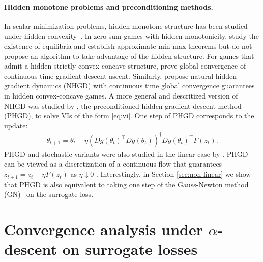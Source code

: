 \documentclass{article} %
\theoremstyle{definition}
\begin{document}
\paragraph{Hidden monotone problems and preconditioning methods.}
In scalar minimization problems, hidden monotone structure has been studied under hidden convexity~\citep{JMLR:francis,xia2020survey, chancelier2021conditional, fatkhullin2023stochastic}.
In zero-sum games with hidden monotonicity, \citet{gidel2021limited} study the existence of equilibria and establish approximate min-max theorems but do not propose an algorithm to take advantage of the hidden structure.
For games that admit a hidden strictly convex-concave structure, \citet{vlatakis2021solving} prove global convergence of continuous time gradient descent-ascent.
Similarly, \citet{mladenovic2022generalized} propose natural hidden gradient dynamics (NHGD) with continuous time global convergence guarantees in hidden convex-concave games.
A more general and descritized version of NHGD was studied by \citet{sakos2024exploiting}, the preconditioned hidden gradient descent method (PHGD), to solve VIs of the form \eqref{eq:vi}. One step of PHGD corresponds to the update:
\begin{align}\label{eq:phgd}
    \theta_{t+1} = \theta_t - \eta(Dg(\theta_t)^\top Dg(\theta_t))^{\dag}Dg(\theta_t)^\top F(z_t).
\end{align}
PHGD and stochastic variants were also studied in the linear case by \citet{bertsekas2009projected}.
PHGD can be viewed as a discretization of a continuous flow that guarantees $z_{t+1} = z_t-\eta F(z_t)$ as $\eta \downarrow 0$ \citep{sakos2024exploiting}. 
Interestingly, in Section \ref{sec:non-linear} we show that PHGD is also equivalent to taking one step of the Gauss-Newton method (GN)~\citep{bjorck1996numerical} on the surrogate loss.




\vspace{-0.5em}
\section{Convergence analysis under $\alpha$-descent on surrogate losses}
\end{document}
